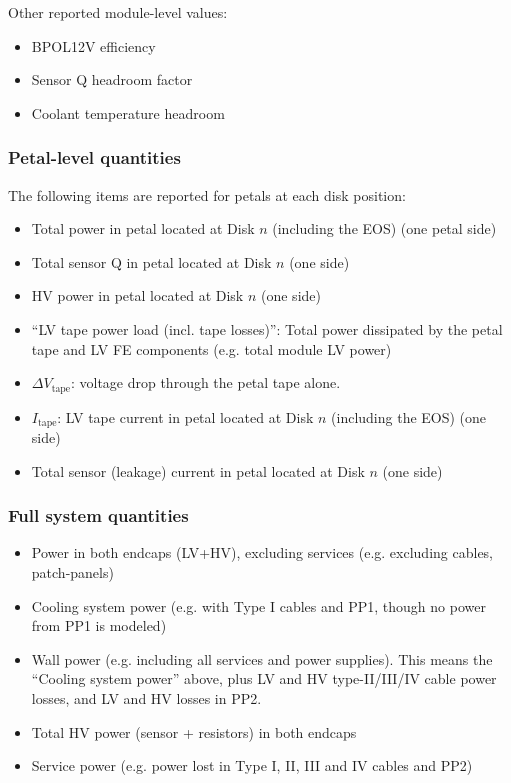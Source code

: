 Other reported module-level values:
\begin{itemize}
\setlength\itemsep{0.0em}
\item BPOL12V efficiency
\item Sensor Q headroom factor
\item Coolant temperature headroom
\end{itemize}

\subsubsection{Petal-level quantities}

The following items are reported for petals at each disk position:
\begin{itemize}
\setlength\itemsep{0.0em}
\item Total power in petal located at Disk $n$ (including the EOS) (one petal side)
\item Total sensor Q in petal located at Disk $n$ (one side)
\item HV power in petal located at Disk $n$ (one side)
\item ``LV tape power load (incl. tape losses)'': Total power dissipated by the petal tape and LV
FE components (e.g. total module LV power)
\item $\Delta V_\text{tape}$: voltage drop through the petal tape alone.
\item $I_\text{tape}$: LV tape current in petal located at Disk $n$ (including the EOS) (one side)
\item Total sensor (leakage) current in petal located at Disk $n$ (one side)
\end{itemize}

\subsubsection{Full system quantities}

\begin{itemize}
\setlength\itemsep{0.0em}
\item Power in both endcaps (LV+HV), excluding services (e.g. excluding cables, patch-panels)
\item Cooling system power (e.g. with Type I cables and PP1, though no power from PP1 is modeled)
\item Wall power (e.g. including all services and power supplies). This means the ``Cooling system power''
  above, plus LV and HV type-II/III/IV cable power losses, and LV and HV losses in PP2.
\item Total HV power (sensor + resistors) in both endcaps
\item Service power (e.g. power lost in Type I, II, III and IV cables and PP2) %
\end{itemize}

